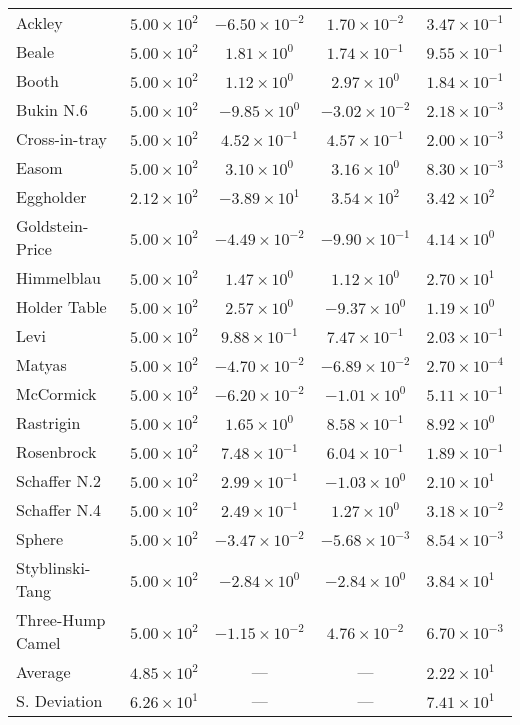 \begin{longtable}{|l|r|c|c|l|}
    Ackley &	$5.00 \times 10^{2}$ &	$-6.50 \times 10^{-2}$ &	$1.70 \times 10^{-2}$ &	$3.47 \times 10^{-1}$\\
    Beale &	$5.00 \times 10^{2}$ &	$1.81 \times 10^{0}$ &	$1.74 \times 10^{-1}$ &	$9.55 \times 10^{-1}$\\
    Booth &	$5.00 \times 10^{2}$ &	$1.12 \times 10^{0}$ &	$2.97 \times 10^{0}$ &	$1.84 \times 10^{-1}$\\
    Bukin N.6 &	$5.00 \times 10^{2}$ &	$-9.85 \times 10^{0}$ &	$-3.02 \times 10^{-2}$ &	$2.18 \times 10^{-3}$\\
    Cross-in-tray &	$5.00 \times 10^{2}$ &	$4.52 \times 10^{-1}$ &	$4.57 \times 10^{-1}$ &	$2.00 \times 10^{-3}$\\
    Easom &	$5.00 \times 10^{2}$ &	$3.10 \times 10^{0}$ &	$3.16 \times 10^{0}$ &	$8.30 \times 10^{-3}$\\
    Eggholder &	$2.12 \times 10^{2}$ &	$-3.89 \times 10^{1}$ &	$3.54 \times 10^{2}$ &	$3.42 \times 10^{2}$\\
    Goldstein-Price &	$5.00 \times 10^{2}$ &	$-4.49 \times 10^{-2}$ &	$-9.90 \times 10^{-1}$ &	$4.14 \times 10^{0}$\\
    Himmelblau &	$5.00 \times 10^{2}$ &	$1.47 \times 10^{0}$ &	$1.12 \times 10^{0}$ &	$2.70 \times 10^{1}$\\
    Holder Table &	$5.00 \times 10^{2}$ &	$2.57 \times 10^{0}$ &	$-9.37 \times 10^{0}$ &	$1.19 \times 10^{0}$\\
    Levi &	$5.00 \times 10^{2}$ &	$9.88 \times 10^{-1}$ &	$7.47 \times 10^{-1}$ &	$2.03 \times 10^{-1}$\\
    Matyas &	$5.00 \times 10^{2}$ &	$-4.70 \times 10^{-2}$ &	$-6.89 \times 10^{-2}$ &	$2.70 \times 10^{-4}$\\
    McCormick &	$5.00 \times 10^{2}$ &	$-6.20 \times 10^{-2}$ &	$-1.01 \times 10^{0}$ &	$5.11 \times 10^{-1}$\\
    Rastrigin &	$5.00 \times 10^{2}$ &	$1.65 \times 10^{0}$ &	$8.58 \times 10^{-1}$ &	$8.92 \times 10^{0}$\\
    Rosenbrock &	$5.00 \times 10^{2}$ &	$7.48 \times 10^{-1}$ &	$6.04 \times 10^{-1}$ &	$1.89 \times 10^{-1}$\\
    Schaffer N.2 &	$5.00 \times 10^{2}$ &	$2.99 \times 10^{-1}$ &	$-1.03 \times 10^{0}$ &	$2.10 \times 10^{1}$\\
    Schaffer N.4 &	$5.00 \times 10^{2}$ &	$2.49 \times 10^{-1}$ &	$1.27 \times 10^{0}$ &	$3.18 \times 10^{-2}$\\
    Sphere &	$5.00 \times 10^{2}$ &	$-3.47 \times 10^{-2}$ &	$-5.68 \times 10^{-3}$ &	$8.54 \times 10^{-3}$\\
    Styblinski-Tang &	$5.00 \times 10^{2}$ &	$-2.84 \times 10^{0}$ &	$-2.84 \times 10^{0}$ &	$3.84 \times 10^{1}$\\
    Three-Hump Camel &	$5.00 \times 10^{2}$ &	$-1.15 \times 10^{-2}$ &	$4.76 \times 10^{-2}$ &	$6.70 \times 10^{-3}$\\
    \hline 
    \hline
    Average &	$4.85 \times 10^{2}$ &	--- &	--- &	$2.22 \times 10^{1}$\\
    \hline
    S. Deviation &	$6.26 \times 10^{1}$ &	--- &	--- &	$7.41 \times 10^{1}$\\
\end{longtable}
